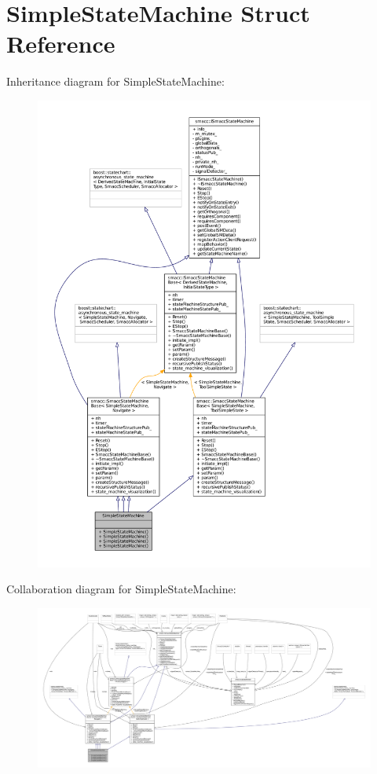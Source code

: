 \hypertarget{structSimpleStateMachine}{}\section{Simple\+State\+Machine Struct Reference}
\label{structSimpleStateMachine}


Inheritance diagram for Simple\+State\+Machine\+:
\nopagebreak
\begin{figure}[H]
\begin{center}
\leavevmode
\includegraphics[width=350pt]{structSimpleStateMachine__inherit__graph}
\end{center}
\end{figure}


Collaboration diagram for Simple\+State\+Machine\+:
\nopagebreak
\begin{figure}[H]
\begin{center}
\leavevmode
\includegraphics[width=350pt]{structSimpleStateMachine__coll__graph}
\end{center}
\end{figure}

